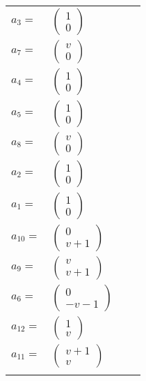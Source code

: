 \documentclass[1p]{elsarticle_modified}
\theoremstyle{definition}
\begin{document}
\begin{tabular}{m{7pt} m{180pt} m{7pt} m{180pt} }
\flushright $a_{3}=$&$\begin{pmatrix}1\\0\end{pmatrix}$ \\
\flushright $a_{7}=$&$\begin{pmatrix}v\\0\end{pmatrix}$ \\
\flushright $a_{4}=$&$\begin{pmatrix}1\\0\end{pmatrix}$ \\
\flushright $a_{5}=$&$\begin{pmatrix}1\\0\end{pmatrix}$ \\
\flushright $a_{8}=$&$\begin{pmatrix}v\\0\end{pmatrix}$ \\
\flushright $a_{2}=$&$\begin{pmatrix}1\\0\end{pmatrix}$ \\
\flushright $a_{1}=$&$\begin{pmatrix}1\\0\end{pmatrix}$ \\
\flushright $a_{10}=$&$\begin{pmatrix}0\\v+1\end{pmatrix}$ \\
\flushright $a_{9}=$&$\begin{pmatrix}v\\v+1\end{pmatrix}$ \\
\flushright $a_{6}=$&$\begin{pmatrix}0\\- v-1\end{pmatrix}$ \\
\flushright $a_{12}=$&$\begin{pmatrix}1\\v\end{pmatrix}$ \\
\flushright $a_{11}=$&$\begin{pmatrix}v+1\\v\end{pmatrix}$\\&\end{tabular}
\end{document}
